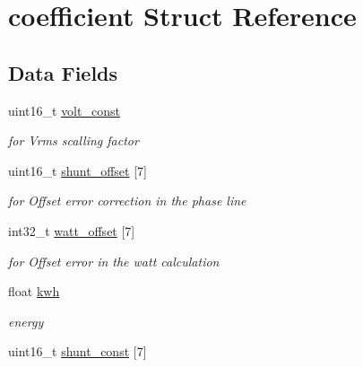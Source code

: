 \hypertarget{structcoefficient}{\section{coefficient Struct Reference}
\label{structcoefficient}
}
\subsection*{Data Fields}
\begin{DoxyCompactItemize}
\item 
\hypertarget{structcoefficient_a855536d65a20ca25b4bde6ab47b729db}{uint16\-\_\-t \hyperlink{structcoefficient_a855536d65a20ca25b4bde6ab47b729db}{volt\-\_\-const}}\label{structcoefficient_a855536d65a20ca25b4bde6ab47b729db}

\begin{DoxyCompactList}\small\item\em for Vrms scalling factor \end{DoxyCompactList}\item 
\hypertarget{structcoefficient_aa4b2357026da49175e03dccecb768e8a}{uint16\-\_\-t \hyperlink{structcoefficient_aa4b2357026da49175e03dccecb768e8a}{shunt\-\_\-offset} \mbox{[}7\mbox{]}}\label{structcoefficient_aa4b2357026da49175e03dccecb768e8a}

\begin{DoxyCompactList}\small\item\em for Offset error correction in the phase line \end{DoxyCompactList}\item 
\hypertarget{structcoefficient_ad3b31b3df5b4dc8b589bab2a212a57eb}{int32\-\_\-t \hyperlink{structcoefficient_ad3b31b3df5b4dc8b589bab2a212a57eb}{watt\-\_\-offset} \mbox{[}7\mbox{]}}\label{structcoefficient_ad3b31b3df5b4dc8b589bab2a212a57eb}

\begin{DoxyCompactList}\small\item\em for Offset error in the watt calculation \end{DoxyCompactList}\item 
\hypertarget{structcoefficient_abd0ce4db52c76e27f107d043bb668604}{float \hyperlink{structcoefficient_abd0ce4db52c76e27f107d043bb668604}{kwh}}\label{structcoefficient_abd0ce4db52c76e27f107d043bb668604}

\begin{DoxyCompactList}\small\item\em energy \end{DoxyCompactList}\item 
\hypertarget{structcoefficient_aed79ceb2bf0c2b22201cdfcd0afa14ce}{uint16\-\_\-t \hyperlink{structcoefficient_aed79ceb2bf0c2b22201cdfcd0afa14ce}{shunt\-\_\-const} \mbox{[}7\mbox{]}}\label{structcoefficient_aed79ceb2bf0c2b22201cdfcd0afa14ce}


\end{DoxyCompactItemize}
